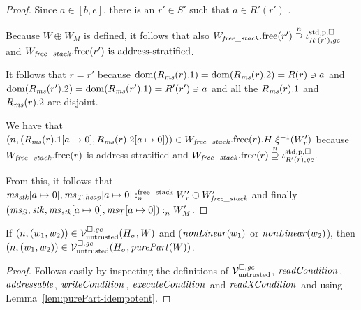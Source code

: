 \begin{proof}
  Since $a \in [b,e]$, there is an $r' \in S'$ such that $a \in R'(r')$ .
  
  Because $W \oplus W_M$ is defined, it follows that also 
  $\pwfree[W_\var{free\_stack}](r') \nsupeq \stdreg{R'(r'),\gc}{\pur}$ and
  $\pwfree[W_\var{free\_stack}](r') \text{ is address-stratified}$.

  It follows that $r = r'$ because $\dom(R_\ms(r).1) = \dom(R_\ms(r).2) = R(r) \ni a$ and $ \dom(R_\ms(r').2) = \dom(R_\ms(r').1) = R'(r') \ni a$ and all the $R_\ms(r).1$ and $R_\ms(r).2$ are disjoint.

  We have that $\npair{(R_\ms(r).1\update{a}{0},R_\ms(r).2\update{a}{0})} \in \pwfree[W_\var{free\_stack}](r).H \; \xi^{-1}(W_r')$ because $\pwfree[W_\var{free\_stack}](r)$ is address-stratified and $\pwfree[W_\var{free\_stack}](r) \nsupeq \stdreg{R'(r),\gc}{\pur}$.

  From this, it follows that $\memSatFStack{\ms_\stk\update{a}{0},\ms_\var{T,heap}\update{a}{0}}{W_r' \oplus W_\var{free\_stack}'}$ and finally $\memSat{(\ms_S,\stk,\ms_\stk\update{a}{0},\ms_T\update{a}{0})}{W_M'}$.
\end{proof}


\begin{lemma}
  \label{lem:non-linear-pure}
  If $\npair{(w_1,w_2)} \in \lrv(H_\sigma,W)$ and ($\nonLinear{w_1}$ or $\nonLinear{w_2}$), then
  $\npair{(w_1,w_2)} \in \lrv(H_\sigma,\purePart{W})$.
\end{lemma}
\begin{proof}
  Follows easily by inspecting the definitions of $\lrv$, $\readCond[]{}$, $\addressable{}$, $\writeCond[]{}$, $\execCond[]{}$ and $\xReadCond[]{}$ and using Lemma~\ref{lem:purePart-idempotent}.
\end{proof}

